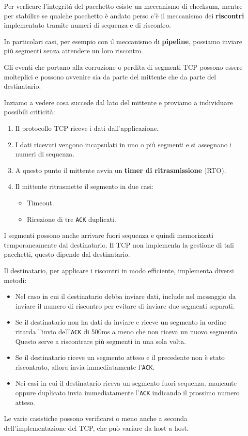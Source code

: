 Per verficare l'integrità del pacchetto esiste un meccanismo di checksum, mentre per stabilire se
qualche pacchetto è andato perso c'è il meccanismo dei \textbf{riscontri} implementato tramite
numeri di sequenza e di riscontro.

In particolari casi, per esempio con il meccanismo di \textbf{pipeline}, possiamo inviare più
segmenti senza attendere un loro riscontro.

Gli eventi che portano alla corruzione o perdita di segmenti TCP possono essere molteplici e
possono avvenire sia da parte del mittente che da parte del destinatario.

Inziamo a vedere cosa succede dal lato del mittente e proviamo a individuare possibili criticità:
\begin{enumerate}
	\item Il protocollo TCP riceve i dati dall'applicazione.
	\item I dati ricevuti vengono incapsulati in uno o più segmenti e si assegnano i numeri di
		sequenza.
	\item A questo punto il mittente avvia un \textbf{timer di ritrasmissione} (RTO).
	\item Il mittente ritrasmette il segmento in due casi:
		\begin{itemize}
			\item Timeout.
			\item Ricezione di tre \verb|ACK| duplicati.
		\end{itemize}
\end{enumerate}
I segmenti possono anche arrivare fuori sequenza e quindi memorizzati temporaneamente dal 
destinatario. Il TCP non implementa la gestione di tali pacchetti, questo dipende dal destinatario.

Il destinatario, per applicare i riscontri in modo efficiente, implementa diversi metodi:
\begin{itemize}
	\item Nel caso in cui il destinatario debba inviare dati, include nel messaggio da inviare
		il numero di riscontro per evitare di inviare due segmenti separati.
	\item Se il destinatario non ha dati da inviare e riceve un segmento in ordine ritarda l'invio
		dell'\verb|ACK| di 500ms a meno che non riceva un nuovo segmento. Questo serve a 
		riscontrare più segmenti in una sola volta.
	\item Se il destinatario riceve un segmento atteso e il precedente non è stato riscontrato,
		allora invia immediatamente l'\verb|ACK|.
	\item Nei casi in cui il destinatario riceva un segmento fuori sequenza, mancante oppure 
		duplicato invia immediatamente l'\verb|ACK| indicando il prossimo numero atteso.
\end{itemize}
Le varie casistiche possono verificarsi o meno anche a seconda dell'implementazione del TCP, che
può variare da host a host.

